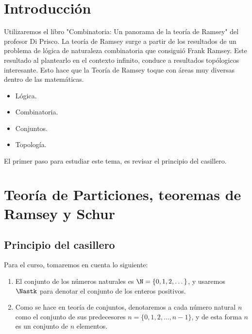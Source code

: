 \section{Introducción}

Utilizaremos el libro "Combinatoria: Un panorama de la teoría de Ramsey" del profesor Di Prisco. La teoría de Ramsey surge a partir de los resultados de un problema de lógica de naturaleza combinatoria que consiguió Frank Ramsey. Este resultado al plantearlo en el contexto infinito, conduce a resultados topólogicos interesante. Esto hace que la Teoría de Ramsey toque con áreas muy diversas dentro de las matemáticas.

\begin{itemize}
    \item Lógica.
    \item Combinatoria.
    \item Conjuntos.
    \item Topología.
\end{itemize}

El primer paso para estudiar este tema, es revisar el principio del casillero.

\section{Teoría de Particiones, teoremas de Ramsey y Schur}

\subsection{Principio del casillero}

\begin{notn} 

    Para el curso, tomaremos en cuenta lo siguiente:
    
    \begin{enumerate}
        \item El conjunto de los números naturales es $\N = \{ 0, 1, 2, \dots \}$, y usaremos $\Nastk$ para denotar el conjunto de los enteros positivos.
        
        \item Como se hace en teoría de conjuntos, denotaremos a cada número natural $n$ como el conjunto de sus predecesores $n = \{0, 1, 2, \dots, n-1\}$, y de esta forma $n$ es un conjunto de $n$ elementos.
    \end{enumerate}
\end{notn}

